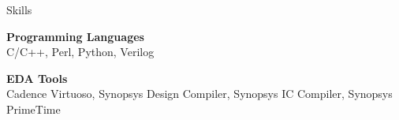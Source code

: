 
\begin{rSection}{Skills}

{\bf Programming Languages} \\
C/C++, Perl, Python, Verilog 


{\bf EDA Tools} \\
Cadence Virtuoso, Synopsys Design Compiler, Synopsys IC Compiler, Synopsys PrimeTime 

\end{rSection}
